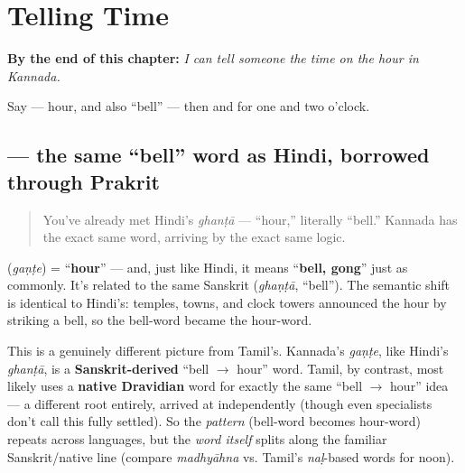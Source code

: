 
\chapter{Telling Time}
\label{ch:ka-telling-time}

\begin{chapteropening}
\textbf{By the end of this chapter:} \emph{I can tell someone the time on the hour in Kannada.}

Say  — hour, and also \textquotedblleft{}bell\textquotedblright{} — then   and   for one and two o'clock.
\end{chapteropening}

\section[\texorpdfstring{\kn{ಗಂಟೆ} (gaṇṭe)}{ಗಂಟೆ (gaṇṭe)}]{ — the same \textquotedblleft{}bell\textquotedblright{} word as Hindi, borrowed through Prakrit}

\label{lesson:KA-C18-gante}



\begin{quote}
You've already met Hindi's \emph{ghanṭā} — \textquotedblleft{}hour,\textquotedblright{} literally \textquotedblleft{}bell.\textquotedblright{} Kannada has the exact same word, arriving by the exact same logic.
\end{quote}

\begin{cousinweb}
\textbf{} (\emph{gaṇṭe}) = \textquotedblleft{}\textbf{hour}\textquotedblright{} — and, just like Hindi, it means \textquotedblleft{}\textbf{bell, gong}\textquotedblright{} just as commonly. It's related to the same Sanskrit \textbf{} (\emph{ghaṇṭā}, \textquotedblleft{}bell\textquotedblright{}). The semantic shift is identical to Hindi's: temples, towns, and clock towers announced the hour by striking a bell, so the bell-word became the hour-word.
\end{cousinweb}

\begin{culture}
This is a genuinely different picture from Tamil's. Kannada's \emph{gaṇṭe}, like Hindi's \emph{ghanṭā}, is a \textbf{Sanskrit-derived} \textquotedblleft{}bell $\to$ hour\textquotedblright{} word. Tamil, by contrast, most likely uses a \textbf{native Dravidian} word for exactly the same \textquotedblleft{}bell $\to$ hour\textquotedblright{} idea — a different root entirely, arrived at independently (though even specialists don't call this fully settled). So the \emph{pattern} (bell-word becomes hour-word) repeats across languages, but the \emph{word itself} splits along the familiar Sanskrit/native line (compare \emph{madhyāhna} vs. Tamil's \emph{naḷ}-based words for noon).
\end{culture}

